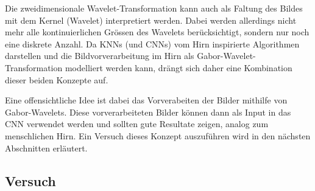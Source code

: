 Die zweidimensionale Wavelet-Transformation kann auch als Faltung des Bildes mit dem Kernel (Wavelet) interpretiert werden.
Dabei werden allerdings nicht mehr alle kontinuierlichen Grössen des Wavelets berücksichtigt, sondern nur noch eine diskrete Anzahl.
Da KNNs (und CNNs) vom Hirn inspirierte Algorithmen darstellen und die Bildvorverarbeitung im Hirn als Gabor-Wavelet-Transformation modelliert werden kann, drängt sich daher eine Kombination dieser beiden Konzepte auf.

Eine offensichtliche Idee ist dabei das Vorverabeiten der Bilder mithilfe von Gabor-Wavelets.
Diese vorverarbeiteten Bilder können dann als Input in das CNN verwendet werden und sollten gute Resultate zeigen, analog zum menschlichen Hirn.
Ein Versuch dieses Konzept auszuführen wird in den nächsten Abschnitten erläutert. %

\subsection{Versuch}

